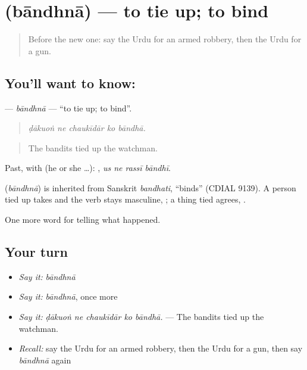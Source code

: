 \section[\texorpdfstring{\ur{باندھنا} (bāndhnā)}{باندھنا (bāndhnā)}]{ (bāndhnā) — to tie up; to bind}

\label{lesson:UR-C280-bandhna}



\begin{quote}
Before the new one: say the Urdu for an armed robbery, then the Urdu for a gun.
\end{quote}

\subsection*{You'll want to know: }
\textbf{} — \emph{bāndhnā} — \textquotedblleft{}to tie up; to bind\textquotedblright{}.

\begin{quote}
    
\end{quote}

\begin{quote}
\emph{ḍākuoṅ ne chaukīdār ko bāndhā.}
\end{quote}

\begin{quote}
The bandits tied up the watchman.
\end{quote}

Past, with  (he or she …):    , \emph{us ne rassī bāndhī}.

\begin{cousinweb}
\textbf{} (\emph{bāndhnā}) is inherited from Sanskrit \emph{bandhati}, \textquotedblleft{}binds\textquotedblright{} (CDIAL 9139). A person tied up takes \textbf{} and the verb stays masculine, \textbf{  }; a thing tied agrees, \textbf{ }.
\end{cousinweb}

\begin{grammarlens}[title={What you've built}]
One more word for telling what happened.
\end{grammarlens}

\subsection*{Your turn}
\begin{itemize}
\raggedright
  \item \emph{Say it:} \emph{bāndhnā}
  \item \emph{Say it:} \emph{bāndhnā}, once more
  \item \emph{Say it:} \emph{ḍākuoṅ ne chaukīdār ko bāndhā.} — The bandits tied up the watchman.
  \item \emph{Recall:} say the Urdu for an armed robbery, then the Urdu for a gun, then say \emph{bāndhnā} again
\end{itemize}

